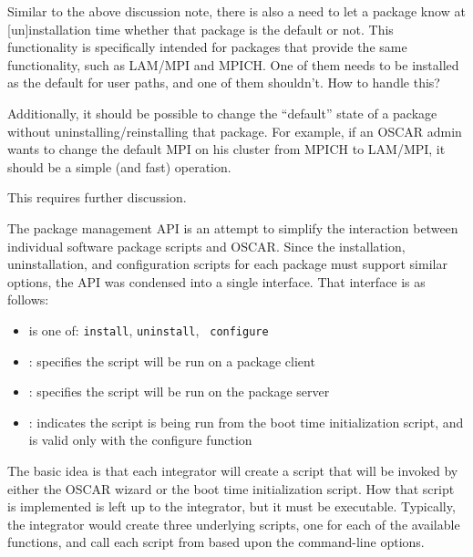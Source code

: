 \begin{discuss}
  Similar to the above discussion note, there is also a need to let a
  package know at [un]installation time whether that package is the
  default or not.  This functionality is specifically intended for
  packages that provide the same functionality, such as LAM/MPI and
  MPICH.  One of them needs to be installed as the default for user
  paths, and one of them shouldn't.  How to handle this?

  Additionally, it should be possible to change the ``default'' state
  of a package without uninstalling/reinstalling that package.  For
  example, if an OSCAR admin wants to change the default MPI on his
  cluster from MPICH to LAM/MPI, it should be a simple (and fast)
  operation.

  This requires further discussion.
\end{discuss}

The package management API is an attempt to simplify the interaction
between individual software package scripts and OSCAR.  Since the
installation, uninstallation, and configuration scripts for each
package must support similar options, the API was condensed into a
single interface. That interface is as follows:


\begin{itemize}
\item {} is one of: {\tt install}, {\tt uninstall}, {\tt
    configure}

\item {}: specifies the script will be run on a package client
  
\item {}: specifies the script will be run on the package server
  
\item {}: indicates the script is being run from the boot
  time initialization script, and is valid only with the configure
  function
\end{itemize}

The basic idea is that each integrator will create a 
script that will be invoked by either the OSCAR wizard or the boot
time initialization script. How that script is implemented is left up
to the integrator, but it must be executable.  Typically, the
integrator would create three underlying scripts, one for each of the
available functions, and call each script from  based
upon the command-line options.

